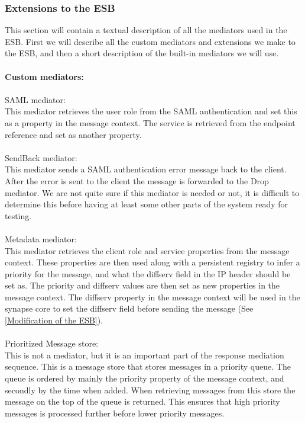     \subsubsection{Extensions to the ESB}\label{Extensions to the ESB} 
    This section will contain a textual description of all the mediators used in the ESB. First we will describe all the custom mediators and extensions we make to the ESB, and then a short description of the built-in mediators we will use.
\\\\
\textbf{Custom mediators:}\\\\
SAML mediator:\\
    This mediator retrieves the user role from the SAML authentication and set this as a property in the message context. The service is retrieved from the endpoint reference and set as another property.
\\\\
SendBack mediator:\\
    This mediator sends a SAML authentication error message back to the client. After the error is sent to the client the message is forwarded to the Drop mediator. We are not quite sure if this mediator is needed or not, it is difficult to determine this before having at least some other parts of the system ready for testing.
\\\\
Metadata mediator:\\
    This mediator retrieves the client role and service properties from the message context. These properties are then used along with a persistent registry to infer a priority for the message, and what the diffserv field in the IP header should be set as. The priority and diffserv values are then set as new properties in the message context.
    The diffserv property in the message context will be used in the synapse core to set the diffserv field before sending the message (See \ref{Modification of the ESB}).
\\\\
Prioritized Message store:\\
    This is not a mediator, but it is an important part of the response mediation sequence. This is a message store that stores messages in a priority queue. The queue is ordered by mainly the priority property of the message context, and secondly by the time when added. When retrieving messages from this store the message on the top of the queue is returned. This ensures that high priority messages is processed further before lower priority messages.
